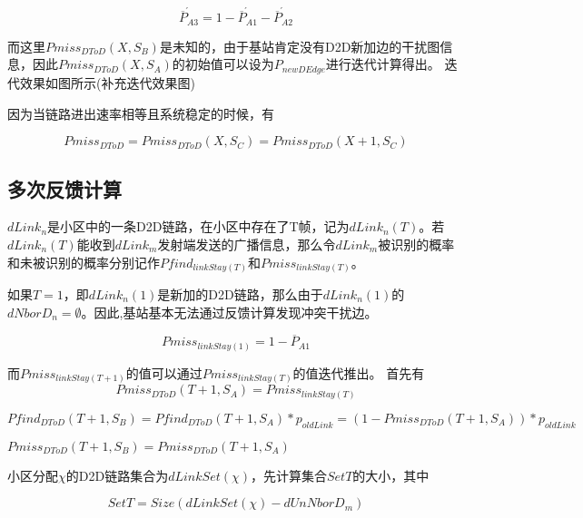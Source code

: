 \documentclass[figurelist,tablelist,algorithmlist,nomlist,masters]{seuthesix}
\begin{document}
	\begin{equation}\label{eq3.1}
	\acute{\overline P _{A3}} = 1 - \acute{\overline P _{A1}} - \acute{\overline P _{A2}}
	\end{equation}
	
	而这里$Pmis{s_{DToD}}{(X,S{_B})}$是未知的，由于基站肯定没有D2D新加边的干扰图信息，因此$Pmis{s_{DToD}}(X,S{_A})$的初始值可以设为${P_{newDEdge}}$进行迭代计算得出。
	迭代效果如图所示(补充迭代效果图)
	
	因为当链路进出速率相等且系统稳定的时候，有
	
	\begin{equation}\label{eq3.1}
	Pmis{s_{DToD}} = Pmis{s_{DToD}}(X,S{_C}) = Pmis{s_{DToD}}(X + 1,S{_C})
	\end{equation}
	
	\subsection{多次反馈计算}
	$dLink_n$是小区中的一条D2D链路，在小区中存在了T帧，记为$dLink_n(T)$。若$dLink_n(T)$能收到$dLink_m$发射端发送的广播信息，那么令$dLink_m$被识别的概率和未被识别的概率分别记作$Pfind_{linkStay(T)}$和$Pmiss_{linkStay(T)}$。
	
	如果$T = 1$，即$dLink_n(1)$是新加的D2D链路，那么由于$dLink_n(1)$的$dNborD_n = \emptyset$。因此,基站基本无法通过反馈计算发现冲突干扰边。
	
	\begin{equation}\label{eq3.1}
	Pmiss_{linkStay(1)} = 1 - \overline P _{A1}
	\end{equation}
	
	而$Pmiss_{linkStay(T + 1)}$的值可以通过$Pmiss_{linkStay(T)}$的值迭代推出。
	首先有
	\begin{equation}\label{eq3.1}
	Pmis{s_{DToD}}(T + 1,S_A) = Pmis{s_{linkStay(T)}}
	\end{equation}
	
	\begin{equation}\label{eq3.1}
	Pfin{d_{DToD}}(T + 1,S_B) = Pfin{d_{DToD}}(T + 1,S_A)*{p_{oldLink}} = (1 - Pmis{s_{DToD}}(T + 1,S_A))*{p_{oldLink}}
	\end{equation}
	
	$Pmis{s_{DToD}}(T + 1,S_B) = Pmis{s_{DToD}}(T + 1,S_A)$
	
	
	小区分配$\chi $的D2D链路集合为$dLinkSet(\chi )$，先计算集合$SetT$的大小，其中
	
	\begin{equation}\label{eq3.1}
	SetT  = Size(dLinkSet(\chi ) - dUnNborD_m)
	\end{equation}
	
\end{document}
